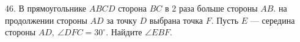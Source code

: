 46. В прямоугольнике $ABCD$ сторона $BC$ в 2 раза больше стороны $AB.$ на продолжении стороны $AD$ за точку $D$ выбрана точка $F.$ Пусть $E$ --- середина стороны $AD,\ \angle DFC=30^\circ.$ Найдите $\angle EBF.$\\
